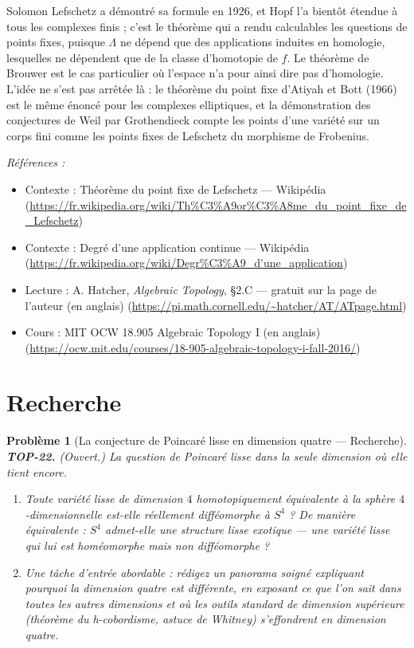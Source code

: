 \documentclass[11pt]{article}
\newtheorem{problem}{Problème}
\newenvironment{refs}{\par\small\noindent\emph{Références :}\begin{itemize}\setlength\itemsep{0pt}}{\end{itemize}\normalsize}
\begin{document}
\noindent Solomon Lefschetz a démontré sa formule en 1926, et Hopf l'a bientôt étendue à tous les
complexes finis ; c'est le théorème qui a rendu calculables les questions de points fixes, puisque
$ \Lambda $ ne dépend que des applications induites en homologie, lesquelles ne dépendent que de la
classe d'homotopie de $ f $. Le théorème de Brouwer est le cas particulier où l'espace n'a pour ainsi
dire pas d'homologie. L'idée ne s'est pas arrêtée là : le théorème du point fixe d'Atiyah et Bott (1966)
est le même énoncé pour les complexes elliptiques, et la démonstration des conjectures de Weil par
Grothendieck compte les points d'une variété sur un corps fini comme les points fixes de Lefschetz du
morphisme de Frobenius.

\begin{refs}
\item Contexte : Théorème du point fixe de Lefschetz --- Wikipédia (\url{https://fr.wikipedia.org/wiki/Th%C3%A9or%C3%A8me_du_point_fixe_de_Lefschetz})
\item Contexte : Degré d'une application continue --- Wikipédia (\url{https://fr.wikipedia.org/wiki/Degr%C3%A9_d'une_application})
\item Lecture : A. Hatcher, \textit{Algebraic Topology}, \S{}2.C --- gratuit sur la page de l'auteur (en anglais) (\url{https://pi.math.cornell.edu/~hatcher/AT/ATpage.html})
\item Cours : MIT OCW 18.905 Algebraic Topology I (en anglais) (\url{https://ocw.mit.edu/courses/18-905-algebraic-topology-i-fall-2016/})
\end{refs}

\bigskip


\section*{Recherche}

\begin{problem}[{La conjecture de Poincaré lisse en dimension quatre --- Recherche}]
\textbf{TOP-22.} (Ouvert.) La question de Poincaré lisse dans la seule dimension où elle tient
encore.
\begin{enumerate}
\item[(a)] Toute variété lisse de dimension $ 4 $ homotopiquement équivalente à la sphère $ 4 $-dimensionnelle
est-elle réellement \textit{difféomorphe} à $ S^4 $ ? De manière équivalente : $ S^4 $ admet-elle une
structure lisse exotique --- une variété lisse qui lui est homéomorphe mais non difféomorphe ?
\item[(b)] Une tâche d'entrée abordable : rédigez un panorama soigné expliquant pourquoi la dimension quatre
est différente, en exposant ce que l'on sait dans toutes les autres dimensions et où les outils standard
de dimension supérieure (théorème du h-cobordisme, astuce de Whitney) s'effondrent en dimension
quatre.
\end{enumerate}

\end{problem}
\end{document}
